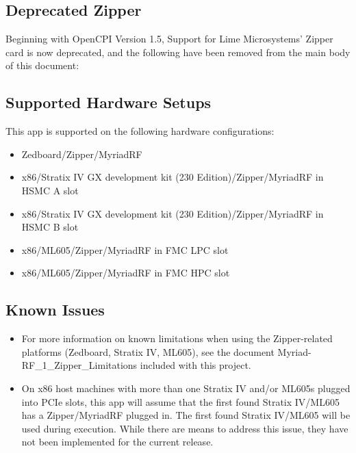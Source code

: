 \begin{appendices}
\section{Deprecated Zipper}
\label{app:Zipper}
Beginning with OpenCPI Version 1.5, Support for Lime Microsystems' Zipper card is now deprecated, and the following have been removed from the main body of this document:\medskip

\subsection{Supported Hardware Setups}
This app is supported on the following hardware configurations:
\begin{itemize}
  \item Zedboard/Zipper/MyriadRF
  \item x86/Stratix IV GX development kit (230 Edition)/Zipper/MyriadRF in HSMC A slot
  \item x86/Stratix IV GX development kit (230 Edition)/Zipper/MyriadRF in HSMC B slot
  \item x86/ML605/Zipper/MyriadRF in FMC LPC slot
  \item x86/ML605/Zipper/MyriadRF in FMC HPC slot
\end{itemize}

\subsection{Known Issues}
\noindent
\begin{itemize}
  \item For more information on known limitations when using the Zipper-related platforms (Zedboard, Stratix IV, ML605), see the document Myriad-RF\_1\_Zipper\_Limitations included with this project.
  \item  On x86 host machines with more than one Stratix IV and/or ML605s plugged into PCIe slots, this app will assume that the first found Stratix IV/ML605 has a Zipper/MyriadRF plugged in. The first found Stratix IV/ML605 will be used during execution. While there are means to address this issue, they have not been implemented for the current release.
\end{itemize}


\end{appendices}
